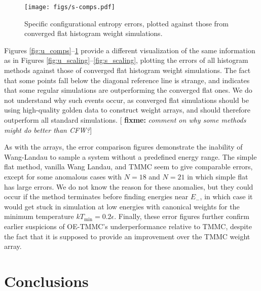 \documentclass[11pt]{article}
\renewcommand{\t}{\text} %
\newcommand{\red}[1]{{\bf \color{red} #1}}
\newcommand{\fixme}[1]{[\red{fixme:} \emph{#1}]}
\begin{document}
\begin{figure}
  \centering
  \texttt{[image: figs/s-comps.pdf]}
  \caption[Configurational entropy error comparisons]
  {Specific configurational entropy errors, plotted against those from
    converged flat histogram weight simulations.}
  \label{fig:s_comps}
\end{figure}

Figures \ref{fig:u_comps}--\ref{fig:s_comps} provide a different
visualization of the same information as in Figures
\ref{fig:u_scaling}--\ref{fig:s_scaling}, plotting the errors of all
histogram methods against those of converged flat histogram weight
simulations. The fact that some points fall below the diagonal
reference line is strange, and indicates that some regular simulations
are outperforming the converged flat ones. We do not understand why
such events occur, as converged flat simulations should be using
high-quality golden data to construct weight arrays, and should
therefore outperform all standard simulations. \fixme{comment on why
  some methods might do better than CFW?}

As with the arrays, the error comparison figures demonstrate the
inability of Wang-Landau to sample a system without a predefined
energy range. The simple flat method, vanilla Wang Landau, and TMMC
seem to give comparable errors, except for some anomalous cases with
$N=18$ and $N=21$ in which simple flat has large errors. We do not
know the reason for these anomalies, but they could occur if the
method terminates before finding energies near $E_-$, in which case it
would get stuck in simulation at low energies with canonical weights
for the minimum temperature $kT_{\t{min}}=0.2\epsilon$. Finally, these
error figures further confirm earlier suspicions of OE-TMMC's
underperformance relative to TMMC, despite the fact that it is
supposed to provide an improvement over the TMMC weight array.


\section{Conclusions}
\label{sec:conclusions}
\end{document}
